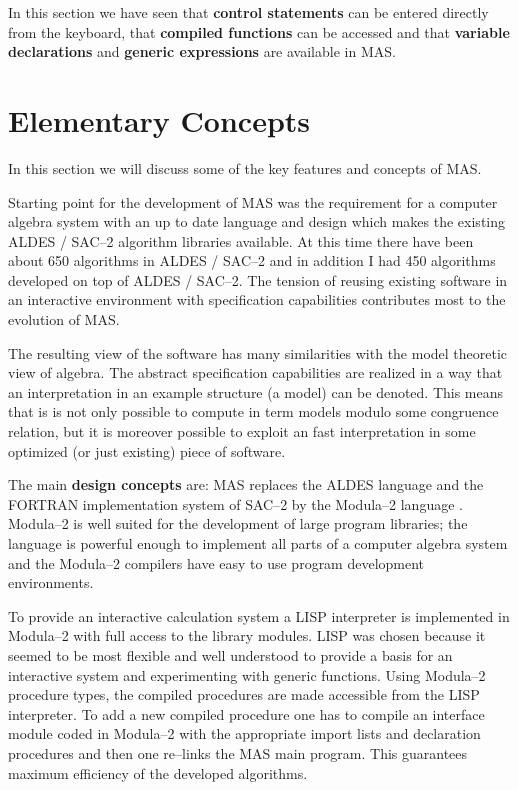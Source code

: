 In this section we have seen that 
{\bf control statements} can be entered directly from the keyboard,
that {\bf compiled functions} can be accessed 
and that {\bf variable declarations} and
{\bf generic expressions} are available in MAS.


\chapter{Elementary Concepts} %

In this section we will discuss some of the key features and
concepts of MAS. 

Starting point for the development of MAS 
was the requirement for a computer algebra system 
with an up to date language and design which makes 
the existing ALDES / SAC--2 algorithm libraries available. 
At this time there have been about 650 algorithms 
in ALDES / SAC--2 and in addition I had 450 algorithms 
developed on top of ALDES / SAC--2.
The tension of reusing existing software 
in an interactive environment with specification 
capabilities contributes most to the evolution of MAS.

The resulting view of the software has many 
similarities with the model theoretic view of algebra.
The abstract specification capabilities are 
realized in a way that an interpretation in an 
example structure (a model) can be denoted. 
This means that is is not only possible to compute in 
term models modulo some congruence relation, but 
it is moreover possible to exploit an fast interpretation 
in some optimized (or just existing) piece of software.  

The main {\bf design concepts} are:
MAS replaces the ALDES language \cite{Loos 76} and
the FORTRAN implementation system of SAC--2
by the Modula--2 language \cite{Wirth 85a}.
Modula--2 is well suited for the development of large
program libraries; the language is powerful enough to
implement all parts of a computer algebra system and the
Modula--2 compilers have easy to use program development
environments.

To provide an interactive calculation system a
LISP interpreter is implemented in Modula--2 with
full access to the library modules.
LISP was chosen because it seemed to be
most flexible and well understood to provide a basis for 
an interactive system and experimenting with generic functions.
Using Modula--2 procedure types, 
the compiled procedures are made accessible from the LISP 
interpreter. To add a new compiled procedure one has to compile an 
interface module coded in Modula--2 with the appropriate 
import lists and declaration procedures 
and then one re--links the MAS main program. 
This guarantees maximum efficiency of the developed
algorithms.

